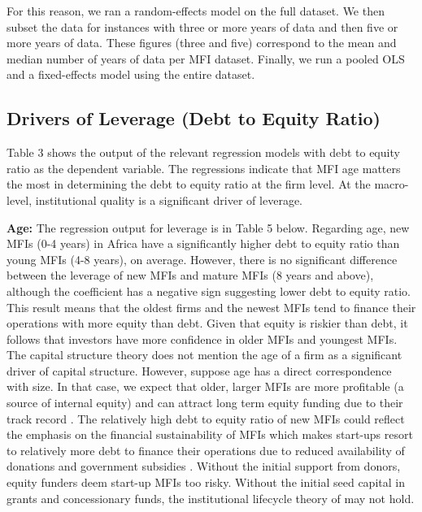 \documentclass[a4paper,nobind]{templates/ociamthesis}
\begin{document}
For this reason, we ran a random-effects model on the full dataset. We then subset the data for instances with three or more years of data and then five or more years of data. These figures (three and five) correspond to the mean and median number of years of data per MFI dataset. Finally, we run a pooled OLS and a fixed-effects model using the entire dataset.

\hypertarget{drivers-of-leverage-debt-to-equity-ratio}{%
\subsection{Drivers of Leverage (Debt to Equity Ratio)}\label{drivers-of-leverage-debt-to-equity-ratio}}

Table 3 shows the output of the relevant regression models with debt to equity ratio as the dependent variable. The regressions indicate that MFI age matters the most in determining the debt to equity ratio at the firm level. At the macro-level, institutional quality is a significant driver of leverage.

\textbf{Age:} The regression output for leverage is in Table 5 below. Regarding age, new MFIs (0-4 years) in Africa have a significantly higher debt to equity ratio than young MFIs (4-8 years), on average. However, there is no significant difference between the leverage of new MFIs and mature MFIs (8 years and above), although the coefficient has a negative sign suggesting lower debt to equity ratio. This result means that the oldest firms and the newest MFIs tend to finance their operations with more equity than debt. Given that equity is riskier than debt, it follows that investors have more confidence in older MFIs and youngest MFIs. The capital structure theory does not mention the age of a firm as a significant driver of capital structure. However, suppose age has a direct correspondence with size. In that case, we expect that older, larger MFIs are more profitable (a source of internal equity) and can attract long term equity funding due to their track record \autocite{barclay2005capital,barclay2006debt}. The relatively high debt to equity ratio of new MFIs could reflect the emphasis on the financial sustainability of MFIs which makes start-ups resort to relatively more debt to finance their operations due to reduced availability of donations and government subsidies \autocite{gwatidzo2009corporate}. Without the initial support from donors, equity funders deem start-up MFIs too risky. Without the initial seed capital in grants and concessionary funds, the institutional lifecycle theory of \textcite{bayai2016financing} may not hold.
\end{document}
